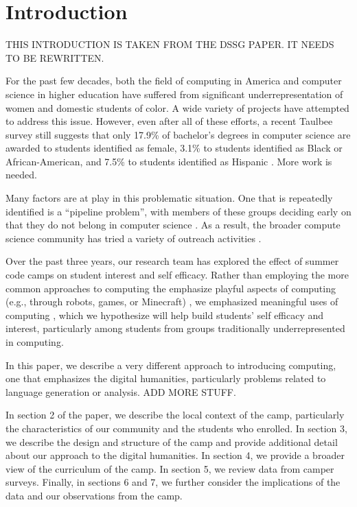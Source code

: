 \section{Introduction}

THIS INTRODUCTION IS TAKEN FROM THE DSSG PAPER.  IT NEEDS TO BE
REWRITTEN.

For the past few decades, both the field of computing in America and
computer science in higher education have suffered from significant
underrepresentation of women and domestic students of color.  A
wide variety of projects have attempted to address this issue.
However, even after all of these efforts, a recent Taulbee survey
still suggests that only 17.9\% of bachelor's degrees in computer
science are awarded to students identified as female, 3.1\% to
students identified as Black or African-American, and 7.5\% to
students identified as Hispanic \cite{Taulbee2016}.  More work is
needed.

Many factors are at play in this problematic situation.  One that
is repeatedly identified is a ``pipeline problem'', with members
of these groups deciding early on that they do not belong in computer
science \cite{Gurer2002}.  As a result, the broader compute science
community has tried a variety of outreach activities
\cite{McGill2015,Decker2016}.

Over the past three years, our research team has explored the effect
of summer code camps on student interest and self efficacy.  Rather
than employing the more common approaches to computing the emphasize
playful aspects of computing (e.g., through robots, games, or
Minecraft) \cite{code-camp-survey-sigcse-2017}, we emphasized
meaningful uses of computing \cite{arts-coding,dssg-sigcse-2018},
which we hypothesize will help build students' self efficacy and
interest, particularly among students from groups traditionally
underrepresented in computing.

In this paper, we describe a very different approach to introducing
computing, one that emphasizes the digital humanities, particularly
problems related to language generation or analysis.  ADD MORE STUFF.

In section 2 of the paper, we describe the local context of the
camp, particularly the characteristics of our community and the
students who enrolled.  In section 3, we describe the design and
structure of the camp and provide additional detail about our
approach to the digital humanities.  In section 4, we provide a
broader view of the curriculum of the camp.  In section 5, we review
data from camper surveys.  Finally, in sections 6 and 7, we further
consider the implications of the data and our observations from the
camp.

